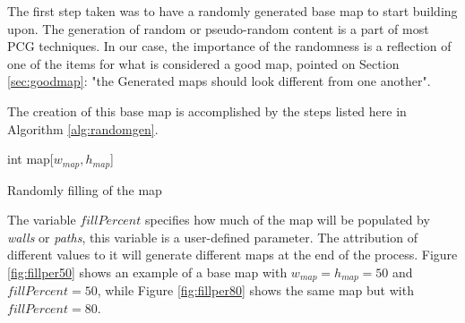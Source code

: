 The first step taken was to have a randomly generated base map to start building upon. The generation of random or pseudo-random content is a part of most PCG techniques. In our case, the importance of the randomness is a reflection of one of the items for what is considered a good map, pointed on Section \ref{sec:goodmap}: "the Generated maps should look different from one another".

The creation of this base map is accomplished by the steps listed here in Algorithm \ref{alg:randomgen}.


\begin{algorithm}[h] 
 \DontPrintSemicolon
 int map[\(w_{map},h_{map}\)]\;
 \caption{Randomly filling of the map}\label{alg:randomgen}
\end{algorithm} 

The variable \(fillPercent\) specifies how much of the map will be populated by \emph{walls} or \emph{paths}, this variable is a user-defined parameter. The attribution of different values to it will generate different maps at the end of the process. Figure \ref{fig:fillper50} shows an example of a base map with \(w_{map} = h_{map} = 50\) and  \(fillPercent = 50\), while Figure \ref{fig:fillper80} shows the same map but with \(fillPercent = 80\).

